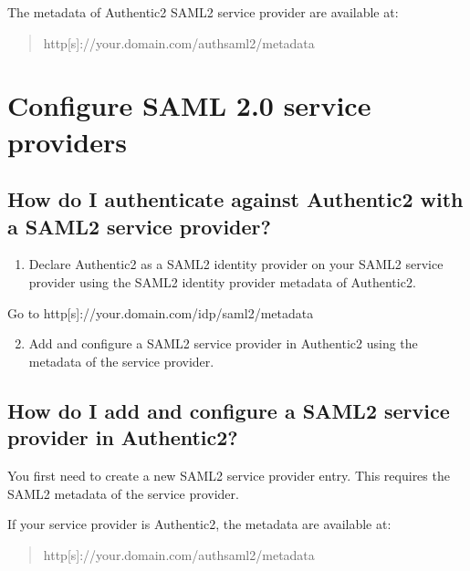 \documentclass[letterpaper,10pt,english]{sphinxmanual}
\begin{document}
The metadata of Authentic2 SAML2 service provider are available at:
\begin{quote}

http{[}s{]}://your.domain.com/authsaml2/metadata
\end{quote}


\section{Configure SAML 2.0 service providers}
\label{config_saml2_sp:configure-saml-2-0-service-providers}\label{config_saml2_sp::doc}\label{config_saml2_sp:config-saml2-sp}

\subsection{How do I authenticate against Authentic2 with a SAML2 service provider?}
\label{config_saml2_sp:how-do-i-authenticate-against-authentic2-with-a-saml2-service-provider}\begin{enumerate}
\item {} 
Declare Authentic2 as a SAML2 identity provider on your SAML2 service provider using the SAML2 identity provider metadata of Authentic2.

\end{enumerate}

Go to http{[}s{]}://your.domain.com/idp/saml2/metadata
\begin{enumerate}
\setcounter{enumi}{1}
\item {} 
Add and configure a SAML2 service provider in Authentic2 using the metadata of the service provider.

\end{enumerate}


\subsection{How do I add and configure a SAML2 service provider in Authentic2?}
\label{config_saml2_sp:how-do-i-add-and-configure-a-saml2-service-provider-in-authentic2}
You first need to create a new SAML2 service provider entry. This requires the
SAML2 metadata of the service provider.

If your service provider is Authentic2, the metadata are available at:
\begin{quote}

http{[}s{]}://your.domain.com/authsaml2/metadata
\end{quote}
\end{document}
